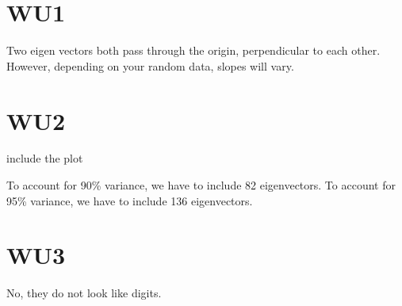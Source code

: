 \section*{WU1}
Two eigen vectors both pass through the origin, perpendicular to each other. However, depending on your random data, slopes will vary. 

\section*{WU2}
include the plot

To account for 90\% variance, we have to include 82 eigenvectors.
To account for 95\% variance, we have to include 136 eigenvectors.


\section*{WU3}

No, they do not look like digits.